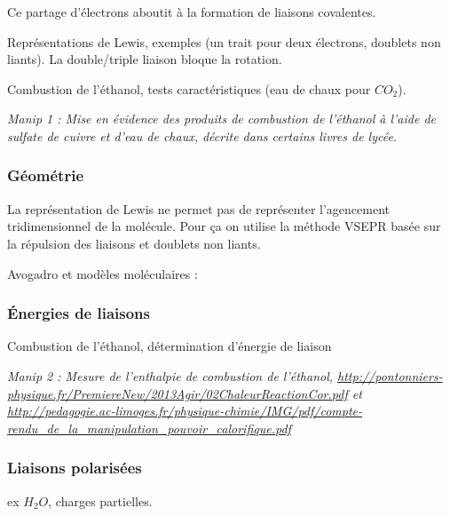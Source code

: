 \documentclass{article}%
\begin{document}
Ce partage d'électrons aboutit à la formation de liaisons covalentes.


Représentations de Lewis, exemples (un trait pour deux électrons, doublets non liants). La double/triple liaison bloque la rotation.

Combustion de l’éthanol, tests caractéristiques (eau de chaux pour $CO_2$).

\textit{Manip 1 : Mise en évidence des produits de combustion de l’éthanol à l’aide de sulfate de cuivre et d’eau
de chaux, décrite dans certains livres de lycée.}
\subsubsection{Géométrie}

La représentation de Lewis ne permet pas de représenter l'agencement tridimensionnel de la molécule. Pour ça on utilise la méthode VSEPR basée sur la répulsion des liaisons et doublets non liants.

Avogadro et modèles moléculaires : 
\subsubsection{Énergies de liaisons}
Combustion de l’éthanol, détermination d’énergie de liaison

\textit{Manip 2 : Mesure de l’enthalpie de combustion de l’éthanol, \url{http://pontonniers-physique.fr/PremiereNew/2013Agir/02ChaleurReactionCor.pdf} et \url{http://pedagogie.ac-limoges.fr/physique-chimie/IMG/pdf/compte-rendu\_de\_la\_manipulation\_pouvoir\_calorifique.pdf}}
\subsubsection{Liaisons polarisées}


ex $H_2O$, charges partielles.
\end{document}
